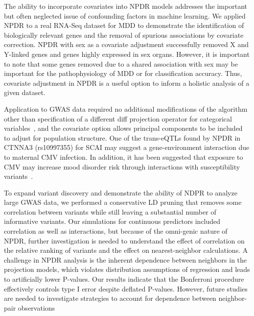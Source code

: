 \documentclass{bioinfo}
\begin{document}

The ability to incorporate covariates into NPDR models addresses the important but often neglected issue of confounding factors in machine learning.
We applied NPDR to a real RNA-Seq dataset for MDD to demonstrate the identification of biologically relevant genes and the removal of spurious associations by covariate correction.
NPDR with sex as a covariate adjustment successfully removed X and Y-linked genes and genes highly expressed in sex organs.
However, it is important to note that some genes removed due to a shared association with sex may be important for the pathophysiology of MDD or for classification accuracy.
Thus, covariate adjustment in NPDR is a useful option to inform a holistic analysis of a given dataset.

Application to GWAS data required no additional modifications of the algorithm other than specification of a different diff projection operator for categorical variables~\citep{titv}, and the covariate option allows principal components to be included to adjust for population structure.
One of the trans-eQTLs found by NPDR in CTNNA3 (rs10997355) for SCAI may suggest a gene-environment interaction due to maternal CMV infection.
In addition, it has been suggested that exposure to CMV may increase mood disorder risk through interactions with susceptibility variants~\citep{kim2007exposure}.

To expand variant discovery and demonstrate the ability of NDPR to analyze large GWAS data, we performed a conservative LD pruning that removes some correlation between variants while still leaving a substantial number of informative variants.
Our simulations for continuous predictors included correlation as well as interactions, but because of the omni-genic nature of NPDR, further investigation is needed to understand the effect of correlation on the relative ranking of variants and the effect on nearest-neighbor calculations.
A challenge in NPDR analysis is the inherent dependence between neighbors in the projection models, which violates distribution assumptions of regression and leads to artificially lower P-values. Our results indicate that the Bonferroni procedure effectively controls type I error despite deflated P-values. However, future studies are needed to investigate strategies to account for dependence between neighbor-pair observations
\end{document}
